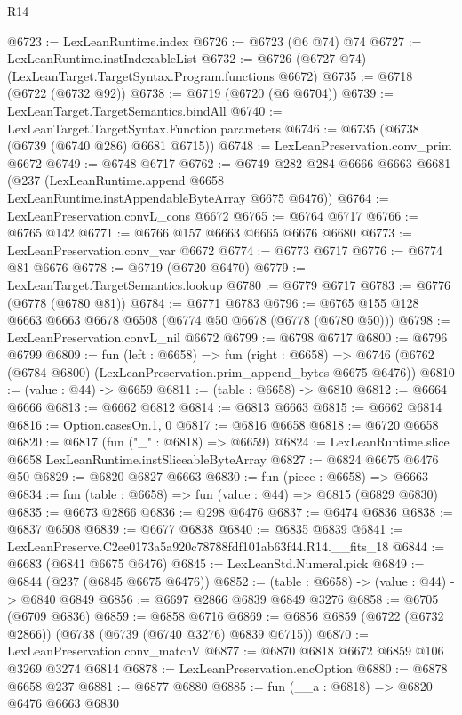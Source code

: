 \begin{lexlean}{R14}
\begin{coremodule}
@6723 := LexLeanRuntime.index
@6726 := @6723 (@6 @74) @74
@6727 := LexLeanRuntime.instIndexableList
@6732 := @6726 (@6727 @74) (LexLeanTarget.TargetSyntax.Program.functions @6672)
@6735 := @6718 (@6722 (@6732 @92))
@6738 := @6719 (@6720 (@6 @6704))
@6739 := LexLeanTarget.TargetSemantics.bindAll
@6740 := LexLeanTarget.TargetSyntax.Function.parameters
@6746 := @6735 (@6738 (@6739 (@6740 @286) @6681 @6715))
@6748 := LexLeanPreservation.conv_prim @6672
@6749 := @6748 @6717
@6762 := @6749
    @282
    @284
    @6666
    @6663
    @6681
    (@237 (LexLeanRuntime.append @6658 LexLeanRuntime.instAppendableByteArray @6675 @6476))
@6764 := LexLeanPreservation.convL_cons @6672
@6765 := @6764 @6717
@6766 := @6765 @142
@6771 := @6766 @157 @6663 @6665 @6676 @6680
@6773 := LexLeanPreservation.conv_var @6672
@6774 := @6773 @6717
@6776 := @6774 @81 @6676
@6778 := @6719 (@6720 @6470)
@6779 := LexLeanTarget.TargetSemantics.lookup
@6780 := @6779 @6717
@6783 := @6776 (@6778 (@6780 @81))
@6784 := @6771 @6783
@6796 := @6765 @155 @128 @6663 @6663 @6678 @6508 (@6774 @50 @6678 (@6778 (@6780 @50)))
@6798 := LexLeanPreservation.convL_nil @6672
@6799 := @6798 @6717
@6800 := @6796 @6799
@6809 := fun (left : @6658) =>
  fun (right : @6658) =>
  @6746 (@6762 (@6784 @6800) (LexLeanPreservation.prim_append_bytes @6675 @6476))
@6810 := (value : @44) -> @6659
@6811 := (table : @6658) -> @6810
@6812 := @6664 @6666
@6813 := @6662 @6812
@6814 := @6813 @6663
@6815 := @6662 @6814
@6816 := Option.casesOn.{1, 0}
@6817 := @6816 @6658
@6818 := @6720 @6658
@6820 := @6817 (fun ("_" : @6818) => @6659)
@6824 := LexLeanRuntime.slice @6658 LexLeanRuntime.instSliceableByteArray
@6827 := @6824 @6675 @6476 @50
@6829 := @6820 @6827 @6663
@6830 := fun (piece : @6658) => @6663
@6834 := fun (table : @6658) => fun (value : @44) => @6815 (@6829 @6830)
@6835 := @6673 @2866
@6836 := @298 @6476
@6837 := @6474 @6836
@6838 := @6837 @6508
@6839 := @6677 @6838
@6840 := @6835 @6839
@6841 := LexLeanPreserve.C2ee0173a5a920c78788fdf101ab63f44.R14.__fits_18
@6844 := @6683 (@6841 @6675 @6476)
@6845 := LexLeanStd.Numeral.pick
@6849 := @6844 (@237 (@6845 @6675 @6476))
@6852 := (table : @6658) -> (value : @44) -> @6840 @6849
@6856 := @6697 @2866 @6839 @6849 @3276
@6858 := @6705 (@6709 @6836)
@6859 := @6858 @6716
@6869 := @6856 @6859 (@6722 (@6732 @2866)) (@6738 (@6739 (@6740 @3276) @6839 @6715))
@6870 := LexLeanPreservation.conv_matchV
@6877 := @6870 @6818 @6672 @6859 @106 @3269 @3274 @6814
@6878 := LexLeanPreservation.encOption
@6880 := @6878 @6658 @237
@6881 := @6877 @6880
@6885 := fun (__a : @6818) => @6820 @6476 @6663 @6830

\end{coremodule}
\end{lexlean}
